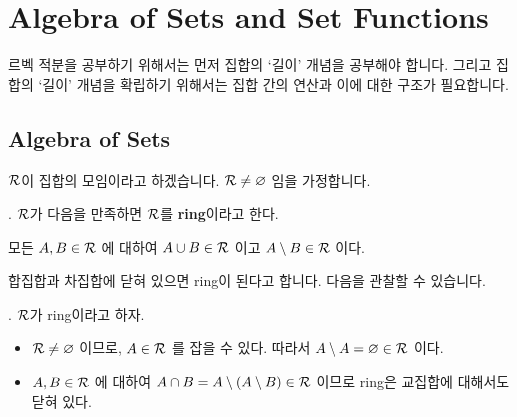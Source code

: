 \begin{center}
    \def\setA{(-0.866, 0.5) circle (\setradius cm)}
    \def\setB{(0.866, 0.5) circle (\setradius cm)}
    \def\setC{(0, -1) circle (\setradius cm)}

\end{center}

\section*{Algebra of Sets and Set Functions}

르벡 적분을 공부하기 위해서는 먼저 집합의 `길이' 개념을 공부해야 합니다. 그리고 집합의 `길이' 개념을 확립하기 위해서는 집합 간의 연산과 이에 대한 구조가 필요합니다.

\subsection*{Algebra of Sets}

\(\mathcal{R}\)이 집합의 모임이라고 하겠습니다. \(\mathcal{R} \neq \varnothing\) 임을 가정합니다.

.  \(\mathcal{R}\)가 다음을 만족하면 \(\mathcal{R}\)를 \textbf{ring}이라고 한다.
\begin{center}
    모든 \(A, B \in \mathcal{R}\) 에 대하여 \(A \cup B \in \mathcal{R}\) 이고 \(A \setminus B \in \mathcal{R}\) 이다.
\end{center}

합집합과 차집합에 닫혀 있으면 ring이 된다고 합니다. 다음을 관찰할 수 있습니다.

\prop. \(\mathcal{R}\)가 ring이라고 하자.
\begin{itemize}
    \item \(\mathcal{R}\neq \varnothing\) 이므로, \(A \in \mathcal{R}\) 를 잡을 수 있다. 따라서 \(A \setminus A = \varnothing \in \mathcal{R}\) 이다.
    \item \(A, B \in \mathcal{R}\) 에 대하여 \(A \cap B = A \setminus (A \setminus B) \in \mathcal{R}\) 이므로 ring은 교집합에 대해서도 닫혀 있다.
\end{itemize}

